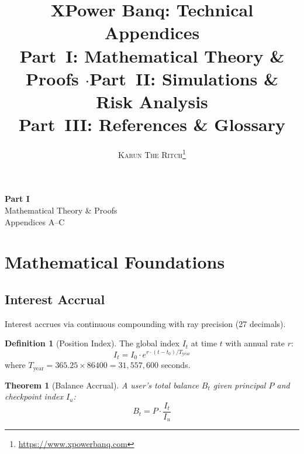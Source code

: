 \documentclass[10pt,a4paper,twocolumn]{article}
\title{\textbf{\Large XPower Banq: Technical Appendices}\\[0.3em]
\normalsize Part~I\@: Mathematical Theory \& Proofs \enspace$\cdot$\enspace Part~II\@: Simulations \& Risk Analysis\\
Part~III\@: References \& Glossary}
\author{
    \textsc{Karun The Ritch}\thanks{\url{https://www.xpowerbanq.com}}
}
\date{}
\theoremstyle{definition}
\newtheorem{definition}{Definition}[section]
\theoremstyle{plain}
\newtheorem{theorem}{Theorem}[section]
\theoremstyle{remark}
\begin{document}
\maketitle


\appendix



\clearpage
\onecolumn
\thispagestyle{empty}
\vspace*{\fill}
\begin{center}
  {\fontsize{36}{42}\selectfont\bfseries Part I}\\[1.5em]
  {\LARGE Mathematical Theory \& Proofs}\\[1em]
  {\large\color{codegray} Appendices A--C}
\end{center}
\vspace*{\fill}
\clearpage
\twocolumn

\section{Mathematical Foundations}
\label{apx:math}

\subsection{Interest Accrual}

Interest accrues via continuous compounding with ray precision (27 decimals).

\begin{definition}[Position Index]
The global index $I_t$ at time $t$ with annual rate $r$:
\begin{equation}
I_t = I_0 \cdot e^{r \cdot (t - t_0) / T_{\text{year}}}
\end{equation}
where $T_{\text{year}} = 365.25 \times 86400 = 31{,}557{,}600$ seconds.
\end{definition}

\begin{theorem}[Balance Accrual]
A user's total balance $B_t$ given principal $P$ and checkpoint index $I_u$:
\begin{equation}
B_t = P \cdot \frac{I_t}{I_u}
\end{equation}
\end{theorem}
\end{document}
